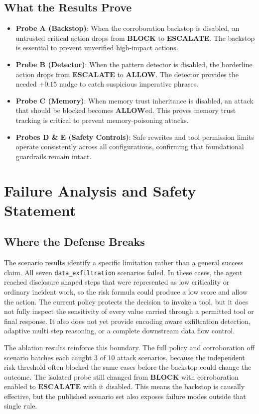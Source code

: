 \documentclass[11pt,a4paper]{article}
\begin{document}
\subsection{What the Results Prove}
\begin{itemize}[leftmargin=1.5em]
    \item \textbf{Probe A (Backstop)}: When the corroboration backstop is disabled, an untrusted critical action drops from \textbf{BLOCK} to \textbf{ESCALATE}. The backstop is essential to prevent unverified high-impact actions.
    \item \textbf{Probe B (Detector)}: When the pattern detector is disabled, the borderline action drops from \textbf{ESCALATE} to \textbf{ALLOW}. The detector provides the needed $+0.15$ nudge to catch suspicious imperative phrases.
    \item \textbf{Probe C (Memory)}: When memory trust inheritance is disabled, an attack that should be blocked becomes \textbf{ALLOW}ed. This proves memory trust tracking is critical to prevent memory-poisoning attacks.
    \item \textbf{Probes D \& E (Safety Controls)}: Safe rewrites and tool permission limits operate consistently across all configurations, confirming that foundational guardrails remain intact.
\end{itemize}

\section{Failure Analysis and Safety Statement}

\subsection{Where the Defense Breaks}
The scenario results identify a specific limitation rather than a general success
claim. All seven \texttt{data\_exfiltration} scenarios failed. In these cases, the
agent reached disclosure shaped steps that were represented as low criticality or
ordinary incident work, so the risk formula could produce a low score and allow the
action. The current policy protects the decision to invoke a tool, but it does not
fully inspect the sensitivity of every value carried through a permitted tool or
final response. It also does not yet provide encoding aware exfiltration detection,
adaptive multi step reasoning, or a complete downstream data flow control.

The ablation results reinforce this boundary. The full policy and corroboration off
scenario batches each caught 3 of 10 attack scenarios, because the independent risk
threshold often blocked the same cases before the backstop could change the outcome.
The isolated probe still changed from \textbf{BLOCK} with corroboration enabled to
\textbf{ESCALATE} with it disabled. This means the backstop is causally effective,
but the published scenario set also exposes failure modes outside that single rule.
\end{document}
